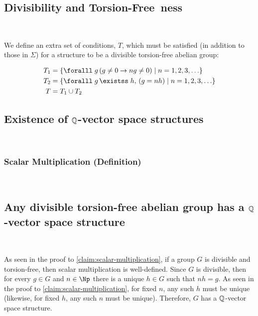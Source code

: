\subsection{Divisibility and Torsion-Free~ness}~\label{sec:div-torsion-free}

We define an extra set of conditions, $T$,
which must be satisfied (in addition to those in $\Sigma$)
for a structure to be a divisible torsion-free abelian group:

\begin{align}
  T_1 &= \set{ \forall g\, (g \neq 0 \lto ng \neq 0) \mid n = 1, 2, 3, \ldots } \\
  T_2 &= \set{ \forall g\, \exists h,\, (g = nh) \mid n = 1, 2, 3, \ldots } \\
  T &= T_1 \cup T_2
\end{align}

\bigskip

\subsection{Existence of \texorpdfstring{$\mathbb{Q}$}{Q}-vector space structures}~\label{sec:q-vector-space}


\subsubsection{Scalar Multiplication (Definition)}~\label{subsec:scalar-multiplication}


\subsection{Any divisible torsion-free abelian group has a
\texorpdfstring{$\mathbb{Q}$}{Q}-vector space structure}~\label{sec:torsion-free-q-vector-space}

As seen in the proof to \ref{claim:scalar-multiplication}, if a group $G$
is divisible and torsion-free, then scalar multiplication is well-defined.
Since $G$ is divisible, then for every $g \in G$ and $n \in \Np$
there is a unique $h \in G$ such that $nh = g$.
As seen in the proof to \ref{claim:scalar-multiplication},
for fixed $n$, any such $h$ must be unique
(likewise, for fixed $h$, any such $n$ must be unique).
Therefore, $G$ has a $\mathbb{Q}$-vector space structure.


